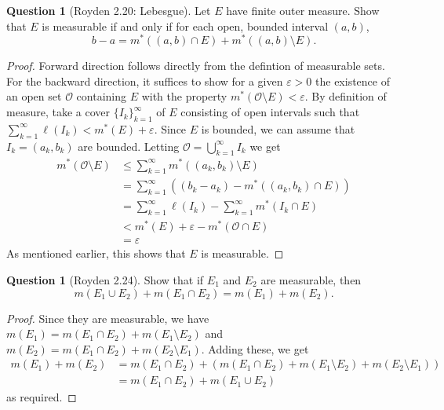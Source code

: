 \documentclass{article}
\theoremstyle{definition} %
\numberwithin{thm}{section} %
\theoremstyle{definition} %
\newtheorem{question}[thm]{Question}
\begin{document}
\begin{question}[Royden 2.20: Lebesgue]
Let $E$ have finite outer measure. Show that $E$ is measurable if and only if for each open, bounded interval $(a, b)$,
\[ b - a = m^*((a, b) \cap E) + m^*((a, b) \setminus E). \]
\end{question}
\begin{proof}
Forward direction follows directly from the defintion of measurable sets. For the backward direction, it suffices to show for a given $\varepsilon > 0$ the existence of an open set $\mathcal{O}$ containing $E$ with the property $m^*(\mathcal{O} \setminus E) < \varepsilon$. By definition of measure, take a cover ${\{I_k\}}_{k = 1}^\infty$ of $E$ consisting of open intervals such that $\sum_{k = 1}^\infty \ell(I_k) < m^*(E) + \varepsilon$. Since $E$ is bounded, we can assume that $I_k = (a_k, b_k)$ are bounded. Letting $\mathcal{O} = \bigcup_{k = 1}^\infty I_k$ we get
\begin{align*}
    m^*(\mathcal{O} \setminus E)
    &\leq \sum_{k = 1}^\infty m^*((a_k, b_k) \setminus E) \\
    &= \sum_{k = 1}^\infty \left((b_k - a_k) - m^*((a_k, b_k) \cap E)\right) \\
    &= \sum_{k = 1}^\infty \ell(I_k) - \sum_{k = 1}^\infty m^*(I_k \cap E) \\
    &< m^*(E) + \varepsilon - m^*(\mathcal{O} \cap E) \\
    &= \varepsilon
\end{align*}
As mentioned earlier, this shows that $E$ is measurable.
\end{proof}

\begin{question}[Royden 2.24]
Show that if $E_1$ and $E_2$ are measurable, then
\[ m(E_1 \cup E_2) + m(E_1 \cap E_2) = m(E_1) + m(E_2). \]
\end{question}
\begin{proof}
Since they are measurable, we have $m(E_1) = m(E_1 \cap E_2) + m(E_1 \setminus E_2)$ and $m(E_2) = m(E_1 \cap E_2) + m(E_2 \setminus E_1)$. Adding these, we get
\begin{align*} 
    m(E_1) + m(E_2) 
    &= m(E_1 \cap E_2) + (m(E_1 \cap E_2) + m(E_1 \setminus E_2) + m(E_2 \setminus E_1)) \\
    &= m(E_1 \cap E_2) + m(E_1 \cup E_2)
\end{align*}
as required.
\end{proof}
\end{document}

